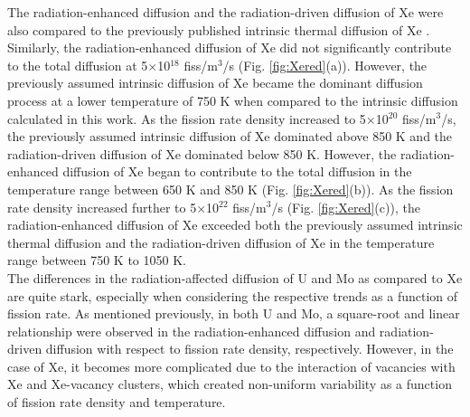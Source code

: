 \documentclass[preprint,12pt]{elsarticle}
\begin{document}
\indent The radiation-enhanced diffusion and the radiation-driven diffusion of Xe were also compared to the previously published intrinsic thermal diffusion of Xe \cite{hu2016microstructural, Beeler2018microstructural}. Similarly, the radiation-enhanced diffusion of Xe did not significantly contribute to the total diffusion at 5$\times$10$^{18}$ fiss/m$^{3}$/s (Fig. \ref{fig:Xered}(a)). However, the previously assumed intrinsic diffusion of Xe became the dominant diffusion process at a lower temperature of 750 K when compared to the intrinsic diffusion calculated in this work. As the fission rate density increased to 5$\times$10$^{20}$ fiss/m$^{3}$/s, the previously assumed intrinsic diffusion of Xe dominated above 850 K and the radiation-driven diffusion of Xe dominated below 850 K. However, the radiation-enhanced diffusion of Xe began to contribute to the total diffusion in the temperature range between 650 K and 850 K (Fig. \ref{fig:Xered}(b)). As the fission rate density increased further to 5$\times$10$^{22}$ fiss/m$^{3}$/s (Fig. \ref{fig:Xered}(c)), the radiation-enhanced diffusion of Xe exceeded both the previously assumed intrinsic thermal diffusion and the radiation-driven diffusion of Xe in the temperature range between 750 K to 1050 K.\\
\indent The differences in the radiation-affected diffusion of U and Mo as compared to Xe are quite stark, especially when considering the respective trends as a function of fission rate. As mentioned previously, in both U and Mo, a square-root and linear relationship were observed in the radiation-enhanced diffusion and radiation-driven diffusion with respect to fission rate density, respectively. However, in the case of Xe, it becomes more complicated due to the interaction of vacancies with Xe and Xe-vacancy clusters, which created non-uniform variability as a function of fission rate density and temperature. 
\\
\end{document}
